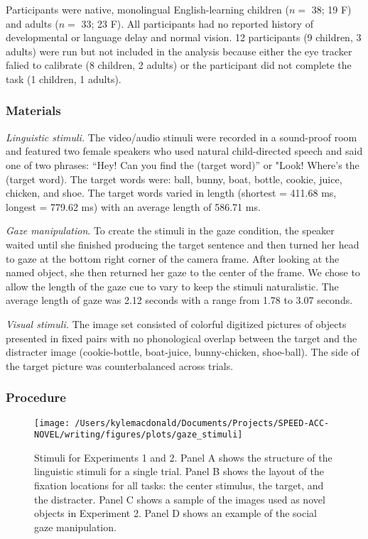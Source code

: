\documentclass[10pt, letterpaper]{article}
\newenvironment{CodeChunk}{}{}
\begin{document}
Participants were native, monolingual English-learning children (\(n=\)
38; 19 F) and adults (\(n=\) 33; 23 F). All participants had no reported
history of developmental or language delay and normal vision. 12
participants (9 children, 3 adults) were run but not included in the
analysis because either the eye tracker falied to calibrate (8 children,
2 adults) or the participant did not complete the task (1 children, 1
adults).

\hypertarget{materials}{%
\subsubsection{Materials}\label{materials}}

\emph{Linguistic stimuli.} The video/audio stimuli were recorded in a
sound-proof room and featured two female speakers who used natural
child-directed speech and said one of two phrases: ``Hey! Can you find
the (target word)'' or "Look! Where's the (target word). The target
words were: ball, bunny, boat, bottle, cookie, juice, chicken, and shoe.
The target words varied in length (shortest = 411.68 ms, longest =
779.62 ms) with an average length of 586.71 ms.

\emph{Gaze manipulation}. To create the stimuli in the gaze condition,
the speaker waited until she finished producing the target sentence and
then turned her head to gaze at the bottom right corner of the camera
frame. After looking at the named object, she then returned her gaze to
the center of the frame. We chose to allow the length of the gaze cue to
vary to keep the stimuli naturalistic. The average length of gaze was
2.12 seconds with a range from 1.78 to 3.07 seconds.

\emph{Visual stimuli.} The image set consisted of colorful digitized
pictures of objects presented in fixed pairs with no phonological
overlap between the target and the distracter image (cookie-bottle,
boat-juice, bunny-chicken, shoe-ball). The side of the target picture
was counterbalanced across trials.

\hypertarget{procedure}{%
\subsubsection{Procedure}\label{procedure}}

\begin{CodeChunk}
\begin{figure*}[t]

{\centering \texttt{[image: /Users/kylemacdonald/Documents/Projects/SPEED-ACC-NOVEL/writing/figures/plots/gaze\_stimuli]} 

}

\caption[Stimuli for Experiments 1 and 2]{Stimuli for Experiments 1 and 2. Panel A shows the structure of the linguistic stimuli for a single trial. Panel B shows the layout of the fixation locations for all tasks: the center stimulus, the target, and the distracter. Panel C shows a sample of the images used as novel objects in Experiment 2. Panel D shows an example of the social gaze manipulation.}\label{fig:gaze-stimuli}
\end{figure*}
\end{CodeChunk}
\end{document}
